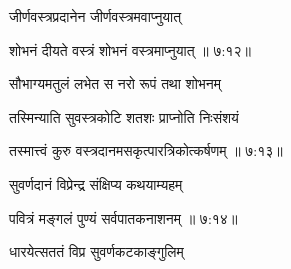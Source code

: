 {\devanagarifont जीर्णवस्त्रप्रदानेन जीर्णवस्त्रमवाप्नुयात्  \danda\dontdisplaylinenum }%
 

{\devanagarifont शोभनं दीयते वस्त्रं शोभनं वस्त्रमाप्नुयात् {॥ ७:१२॥} \veg\dontdisplaylinenum }%
     \var{{\devanagarifont \numemph\vef \lem \mssALL, 
\om\ \msNb}}%

\nemslokalong


\ujvers{}    %


\nemslokab

{\devanagarifont सौभाग्यमतुलं लभेत स नरो रूपं तथा शोभनम्  \danda\dontdisplaylinenum }%

\nemslokac

{\devanagarifont तस्मिन्याति सुवस्त्रकोटि शतशः प्राप्नोति निःसंशयं }%
  \dontdisplaylinenum    {}%



\nemslokad

{\devanagarifont तस्मात्त्वं कुरु वस्त्रदानमसकृत्पारत्रिकोत्कर्षणम् {॥ ७:१३॥} \veg\dontdisplaylinenum }%

\nemslokanormal




\vers


{\devanagarifont सुवर्णदानं विप्रेन्द्र संक्षिप्य कथयाम्यहम् \thinspace{\dandab} \dontdisplaylinenum }%


{\devanagarifont पवित्रं मङ्गलं पुण्यं सर्वपातकनाशनम् {॥ ७:१४॥} \veg\dontdisplaylinenum }%

{\devanagarifont धारयेत्सततं विप्र सुवर्णकटकाङ्गुलिम् \thinspace{\dandab} \dontdisplaylinenum }%

